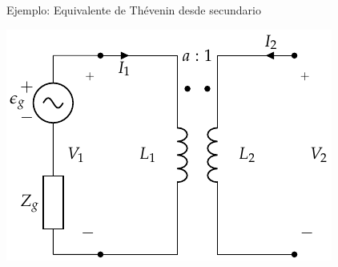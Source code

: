 \documentclass[xcolor={usenames,svgnames,dvipsnames}]{beamer}
\begin{document}
\begin{frame}[label={sec:org962a332}]{Ejemplo: Equivalente de Thévenin desde secundario}
\begin{center}
\includegraphics[width=.9\linewidth]{../figs/Trafo_Perfecto_FuentePrimario.pdf}
\end{center}
\end{frame}
\end{document}
